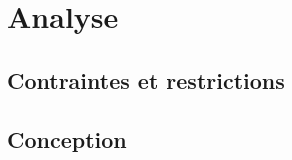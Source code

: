 \part{Analyse}

\clearemptydoublepage
\chapter{Contraintes et restrictions}
\label{chapter:les_contraintes}
\minitoc



\clearemptydoublepage
\chapter{Conception}
\minitoc



